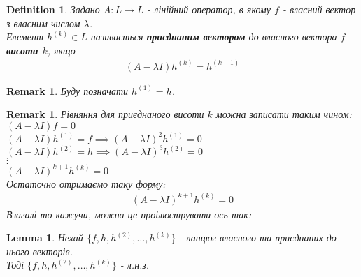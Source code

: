 \documentclass[a4paper, 10pt]{article}
\theoremstyle{theoremdd}
\newtheorem{definition}[theorem]{Definition}
\newtheorem{remark}[theorem]{Remark}
\newtheorem{lemma}[theorem]{Lemma}
\begin{document}
\begin{definition}
Задано $A: L \to L$ - лінійний оператор, в якому $f$ - власний вектор з власним числом $\lambda$.\\
Елемент $h^{(k)} \in L$ називається \textbf{приєднаним вектором} до власного вектора $f$ \textbf{висоти $k$}, якщо
\begin{align*}
(A-\lambda I)h^{(k)} = h^{(k-1)}
\end{align*}
\end{definition}

\begin{remark}
Буду позначати $h^{(1)} = h$.
\end{remark}

\begin{remark}
Рівняння для приєднаного висоти $k$ можна записати таким чином:\\
$(A-\lambda I)f = 0$\\
$(A-\lambda I)h^{(1)} = f \implies (A-\lambda I)^2 h^{(1)} = 0$\\
$(A-\lambda I)h^{(2)} = h \implies (A-\lambda I)^3 h^{(2)} = 0$\\
$\vdots$\\
$(A-\lambda I)^{k+1}h^{(k)} = 0$\\
Остаточно отримаємо таку форму:
\begin{align*}
(A-\lambda I)^{k+1}h^{(k)} = 0
\end{align*}
Взагалі-то кажучи, можна це проілюструвати ось так:
\begin{figure}[H]
\centering
{}
\end{figure}
\end{remark}

\begin{lemma}
Нехай $\{f,h,h^{(2)},\dots,h^{(k)}\}$ - ланцюг власного та приєднаних до нього векторів.\\
Тоді $\{f,h,h^{(2)},\dots,h^{(k)}\}$ - л.н.з.
\end{lemma}
\end{document}

